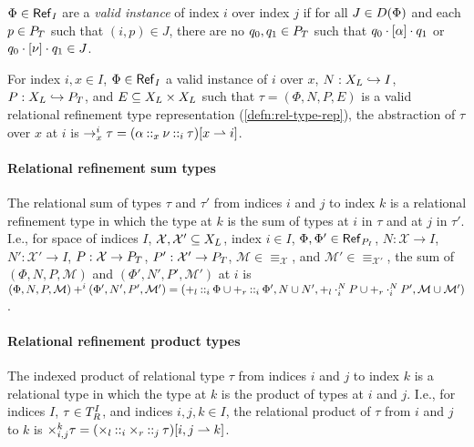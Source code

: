 $\Phi \in \mathsf{Ref}_{ I }$ are a \emph{valid instance} of index $i$
over index $j$ if for all $J \in D(\Phi)$ and each
$p \in P_T$ such that $(i, p) \in J$, there are no
$q_0, q_1 \in P_T$ such that
$q_0 \cdot [ \alpha ] \cdot q_1$ or
$q_0 \cdot [ \nu ] \cdot q_1 \in J$.

For index $i, x \in I$, %
$\Phi \in \mathsf{Ref}_{I}$ a valid instance of $i$ over $x$, %
$N : X_L \hookrightarrow I$, %
$P : X_L \hookrightarrow P_T$, and %
$E \subseteq X_L \times X_L$ such that
$\tau = (\Phi, N, P, E)$ is a valid relational refinement type
representation (\autoref{defn:rel-type-rep}), the abstraction of
$\tau$ over $x$ at $i$ is
$\to_x^i \tau =  (\alpha \mathbin{::}_{x} \nu
  \mathbin{::}_{i} \tau)[  x  \rightharpoonup  i  ]$.

\paragraph{Relational refinement sum types} The relational sum of
types $\tau$ and $\tau'$ from indices $i$ and $j$ to index $k$ is a
relational refinement type in which the type at $k$ is the sum of
types at $i$ in $\tau$ and at $j$ in $\tau'$.
%
I.e., for space of indices $I$,
$\mathcal{X}, \mathcal{X}' \subseteq X_L$, index $i \in I$,
$\Phi, \Phi' \in \mathsf{Ref}_{ P_{I} }$,
$N : \mathcal{X} \to I$, $N' : \mathcal{X}' \to I$,
$P : \mathcal{X} \to P_T$, $P' : \mathcal{X}' \to P_T$, 
$\mathcal{M} \in \equiv_{\mathcal{X}}$, and
$\mathcal{M}' \in \equiv_{\mathcal{X}'}$, the sum of
$(\Phi, N, P, \mathcal{M})$ and $(\Phi', N', P', \mathcal{M}')$ at $i$
is $(\Phi, N, P, \mathcal{M}) +^i (\Phi', N', P', \mathcal{M}') = %
(\tyleftsum \prepend{i} \Phi \union \tyrightsum \prepend{i} \Phi',
N \union N',
\tyleftsum \fullprepend{i}{N} P \union \tyrightsum \fullprepend{i}{N}
P',
\mathcal{M} \union \mathcal{M}')$.

\paragraph{Relational refinement product types}
The indexed product of relational type $\tau$ from indices $i$ and $j$
to index $k$ is a relational type in which the type at $k$ is the
product of types at $i$ and $j$.
%
I.e., for indices $I$, $\tau \in T_{R}^{I}$, and indices
$i, j, k \in I$, the relational product of $\tau$ from $i$ and $j$ to
$k$ is
$\times_{i, j}^k \tau =  (\times_l \mathbin{::}_{i} \times_r
  \mathbin{::}_{j} \tau)[  i, j  \rightharpoonup k ]$.

